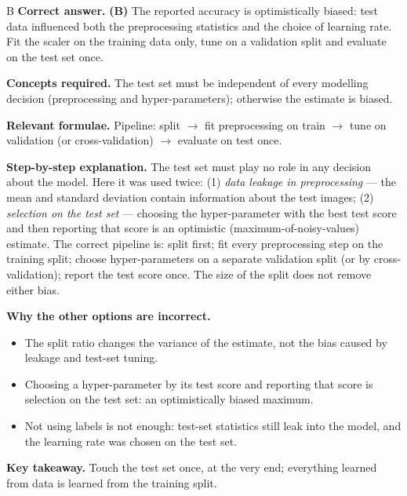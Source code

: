 \documentclass[11pt,a4paper]{article}
\newcommand{\qsep}{\par\vspace{2pt}{\color{black!15}\hrule}\vspace{4pt}}
\begin{document}
\begin{solbox}{B}
\textbf{\color{brand}Correct answer.} \textcolor{okgreen}{\textbf{(B)}} The reported accuracy is optimistically biased: test data influenced both the preprocessing statistics and the choice of learning rate. Fit the scaler on the training data only, tune on a validation split and evaluate on the test set once.

\textbf{\color{brand}Concepts required.} The test set must be independent of every modelling decision (preprocessing and hyper-parameters); otherwise the estimate is biased.

\textbf{\color{brand}Relevant formulae.} Pipeline: split $\to$ fit preprocessing on train $\to$ tune on validation (or cross-validation) $\to$ evaluate on test once.

\textbf{\color{brand}Step-by-step explanation.} The test set must play no role in any decision about the model. Here it was used twice:
(1) \emph{data leakage in preprocessing} --- the mean and standard deviation contain information about the test images;
(2) \emph{selection on the test set} --- choosing the hyper-parameter with the best test score and then reporting that
score is an optimistic (maximum-of-noisy-values) estimate. The correct pipeline is: split first; fit every preprocessing
step on the training split; choose hyper-parameters on a separate validation split (or by cross-validation); report the
test score once. The size of the split does not remove either bias.

\textbf{\color{brand}Why the other options are incorrect.}
\begin{itemize}[leftmargin=2.4em, itemsep=1pt, topsep=2pt]
\item[\textbf{(A)}] The split ratio changes the variance of the estimate, not the bias caused by leakage and test-set tuning.
\item[\textbf{(C)}] Choosing a hyper-parameter by its test score and reporting that score is selection on the test set: an optimistically biased maximum.
\item[\textbf{(D)}] Not using labels is not enough: test-set statistics still leak into the model, and the learning rate was chosen on the test set.
\end{itemize}
\textbf{\color{brand}Key takeaway.} Touch the test set once, at the very end; everything learned from data is learned from the training split.
\end{solbox}
\qsep
\end{document}
